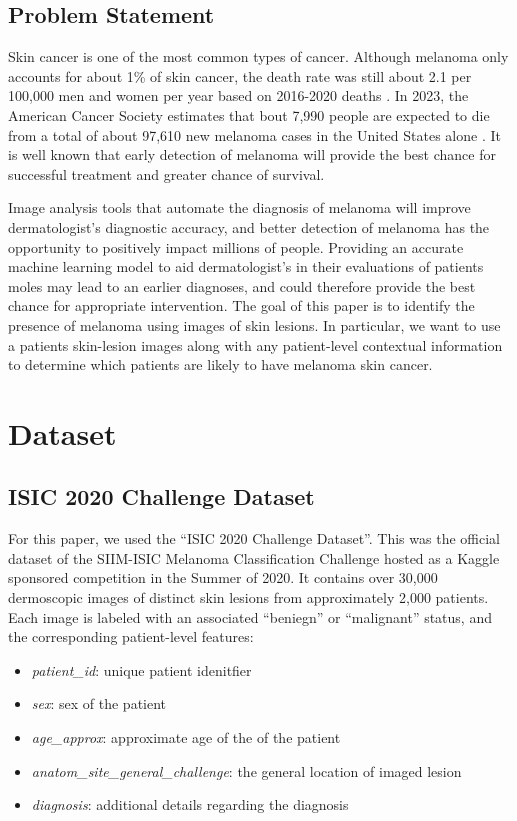 \documentclass [MAS] {uclathes}
\begin{document}
\section{Problem Statement}

Skin cancer is one of the most common types of cancer. Although melanoma only accounts for about 1\% of skin cancer, the death rate was still about 2.1 per 100,000 men and women per year based on 2016-2020 deaths \cite{SEER}. In 2023, the American Cancer Society estimates that bout 7,990 people are expected to die from a total of about 97,610 new melanoma cases in the United States alone \cite{ACS}. It is well known that early detection of melanoma will provide the best chance for successful treatment and greater chance of survival. 

Image analysis tools that automate the diagnosis of melanoma will improve dermatologist's diagnostic accuracy, and better detection of melanoma has the opportunity to positively impact millions of people. Providing an accurate machine learning model to aid dermatologist's in their evaluations of patients moles may lead to an earlier diagnoses, and could therefore provide the best chance for appropriate intervention. The goal of this paper is to identify the presence of melanoma using images of skin lesions. In particular, we want to use a patients skin-lesion images along with any patient-level contextual information to determine which patients are likely to have melanoma skin cancer. 

\chapter{Dataset}

\section{ISIC 2020 Challenge Dataset}

For this paper, we used the ``ISIC 2020 Challenge Dataset''. This was the official dataset of the SIIM-ISIC Melanoma Classification Challenge hosted as a Kaggle sponsored competition in the Summer of 2020. It contains over 30,000 dermoscopic images of distinct skin lesions from approximately 2,000 patients. Each image is labeled with an associated ``beniegn'' or ``malignant'' status, and the corresponding patient-level features: 

\begin{itemize}
    \item \textit{patient\_id}: unique patient idenitfier
    \item \textit{sex}: sex of the patient 
    \item \textit{age\_approx}: approximate age of the of the patient
    \item \textit{anatom\_site\_general\_challenge}: the general location of imaged lesion
    \item \textit{diagnosis}: additional details regarding the diagnosis
\end{itemize}
\end{document}
